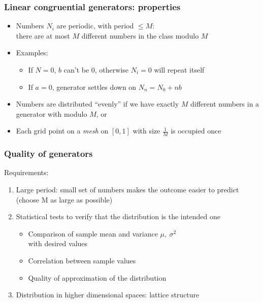 \documentclass[10pt, serif, mathserif]{beamer}
\begin{document}
\begin{frame}
  \frametitle{Linear congruential generators: properties}
  \begin{itemize}
    \item Numbers $N_i$ are periodic, with period $\leq M$: \\ there are at most $M$ different numbers in the class modulo $M$
    \item Examples:
      \begin{itemize}
        \item If $N=0$, $b$ can't be $0$, otherwise $N_i = 0$ will repeat itself
        \item If $a=0$, generator settles down on $N_n = N_0 + nb$
      \end{itemize}
    \item Numbers are distributed ``evenly'' if we have exactly $M$ different numbers in a generator with modulo $M$, or
    \item Each grid point on a \emph{mesh} on $\left[0,1\right]$ with size $\frac{1}{M}$ is occupied once
  \end{itemize}
\end{frame}

\begin{frame}
  \frametitle{Quality of generators}
  Requirements:
  \begin{enumerate}
  	\item Large period: small set of numbers makes the outcome easier to predict (choose M as large as possible)
  	\item Statistical tests to verify that the distribution is the intended one
  	  \begin{itemize}
  	  	\item Comparison of sample mean and variance $\mu,\ \sigma^2$ \\ with desired values
  	  	\item Correlation between sample values
  	  	\item Quality of approximation of the distribution
  	  \end{itemize}
     \item Distribution in higher dimensional spaces: lattice structure
  \end{enumerate}
\end{frame}
\end{document}

